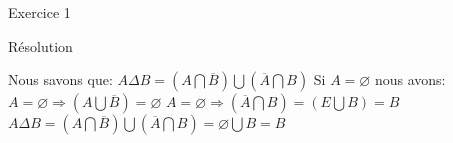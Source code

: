 \hypertarget{Exercice_1}{
\Huge{\begin{center}Exercice 1\end{center} \leavevmode\newline }}

\hypertarget{resolution}{%
\LARGE{Résolution}\label{resolution}}
\newline
\newline
Nous savons que:
\newline
\newline
$A \Delta B = (A \bigcap \overline{B}) \bigcup (\overline{A} \bigcap B)$
\newline
\newline
Si $A = \varnothing$ nous avons:
\newline
\newline
$A = \varnothing \Rightarrow (A \bigcup \overline{B}) = \varnothing$
\newline
$A = \varnothing \Rightarrow (\overline{A} \bigcap B) = (E \bigcup B) = B$
\newline
$A \Delta B = (A \bigcap \overline{B}) \bigcup (\overline{A} \bigcap B) = \varnothing \bigcup B = B$
